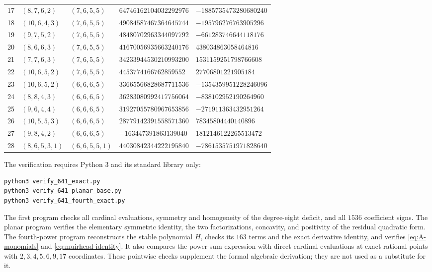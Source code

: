 \documentclass[11pt,a4paper]{article}
\theoremstyle{definition}
\theoremstyle{remark}
\numberwithin{equation}{section}
\begin{document}
\begin{longtable}{@{}rllll@{}}
17 & $(8,7,6,2)$ & $(7,6,5,5)$ & $64746162104032292976$ & $-1885735473280680240$ \\
18 & $(10,6,4,3)$ & $(7,6,5,5)$ & $49084587467364645744$ & $-195796276763905296$ \\
19 & $(9,7,5,2)$ & $(7,6,5,5)$ & $48480702963344097792$ & $-661283746644118176$ \\
20 & $(8,6,6,3)$ & $(7,6,5,5)$ & $41670056935663240176$ & $438034863058464816$ \\
21 & $(7,7,6,3)$ & $(7,6,5,5)$ & $34233944530210993200$ & $1531159251798766608$ \\
22 & $(10,6,5,2)$ & $(7,6,5,5)$ & $4453774166762859552$ & $27706801221905184$ \\
23 & $(10,6,5,2)$ & $(6,6,6,5)$ & $33665566828687711536$ & $-1354359951228246096$ \\
24 & $(8,8,4,3)$ & $(6,6,6,5)$ & $36283080992417756064$ & $-838102952190264960$ \\
25 & $(9,6,4,4)$ & $(6,6,6,5)$ & $31927055780967653856$ & $-271911363432951264$ \\
26 & $(10,5,5,3)$ & $(6,6,6,5)$ & $28779142391558571360$ & $78345804440140896$ \\
27 & $(9,8,4,2)$ & $(6,6,6,5)$ & $-163447391863139040$ & $1812146122265513472$ \\
28 & $(8,6,5,3,1)$ & $(6,6,5,5,1)$ & $44030842344222195840$ & $-7861535751971828640$ \\
\end{longtable}
\endgroup

The verification requires Python 3 and its standard library only:
\begin{verbatim}
python3 verify_641_exact.py
python3 verify_641_planar_base.py
python3 verify_641_fourth_exact.py
\end{verbatim}
The first program checks all cardinal evaluations, symmetry and
homogeneity of the degree-eight deficit, and all $1536$ coefficient
signs.  The planar program verifies the elementary symmetric identity,
the two factorizations, concavity, and positivity of the residual
quadratic form.  The fourth-power program reconstructs the stable
polynomial $H$, checks its
$163$ terms and the exact derivative identity, and verifies
\eqref{eq:A-monomials} and \eqref{eq:muirhead-identity}.  It also
compares the power-sum expression with direct cardinal evaluations at
exact rational points with $2,3,4,5,6,9,17$ coordinates.  These pointwise
checks supplement the formal algebraic derivation; they are not used as
a substitute for it.
\end{document}
